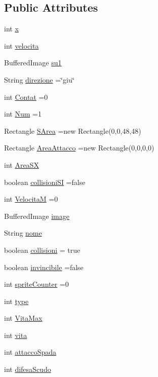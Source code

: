 \subsection*{Public Attributes}
\begin{DoxyCompactItemize}
\item 
int \hyperlink{class_entita_1_1_entita_a6150e0515f7202e2fb518f7206ed97dc}{x}
\item 
int \hyperlink{class_entita_1_1_entita_a40cd1c33d6ccf3a0571a5c5aa3c51a25}{velocita}
\item 
Buffered\+Image \hyperlink{class_entita_1_1_entita_a6e18c56eb6db900f07db511b10b4f075}{su1}
\item 
String \hyperlink{class_entita_1_1_entita_a5bda37a4dbca5f275a41dd383b905277}{direzione} =\char`\"{}giu\char`\"{}
\item 
int \hyperlink{class_entita_1_1_entita_a679c3f7220a014c0a3b78e6023747964}{Contat} =0
\item 
int \hyperlink{class_entita_1_1_entita_a558051bc0b213b418d65f58e4ad9a311}{Num} =1
\item 
Rectangle \hyperlink{class_entita_1_1_entita_abc4c4a84c9edea554a8b72a7d929e664}{S\+Area} =new Rectangle(0,0,48,48)
\item 
Rectangle \hyperlink{class_entita_1_1_entita_aee10046794f54deadcafb19e0494a719}{Area\+Attacco} =new Rectangle(0,0,0,0)
\item 
int \hyperlink{class_entita_1_1_entita_a2d5e9de91cc316910aafdea3973089d8}{Area\+SX}
\item 
boolean \hyperlink{class_entita_1_1_entita_a8253afab60c658fa3427e97e63e8d4ea}{collisioni\+SI} =false
\item 
int \hyperlink{class_entita_1_1_entita_a90a894e061963f9de7d3619983627ccc}{VelocitaM} =0
\item 
Buffered\+Image \hyperlink{class_entita_1_1_entita_a45e94f786577439d02e4f16aefa96717}{image}
\item 
String \hyperlink{class_entita_1_1_entita_a4cfff30ec02286864b995e013b6c2a41}{nome}
\item 
boolean \hyperlink{class_entita_1_1_entita_a8ba457fa7d76f9e2b54085588aced39f}{collisioni} = true
\item 
boolean \hyperlink{class_entita_1_1_entita_afb759606adf5eb47c3e8b17e32968115}{invincibile} =false
\item 
int \hyperlink{class_entita_1_1_entita_a6775e052c6cf2cbafd50a83d1e4b6fc3}{sprite\+Counter} =0
\item 
int \hyperlink{class_entita_1_1_entita_ac765329451135abec74c45e1897abf26}{type}
\item 
int \hyperlink{class_entita_1_1_entita_adf6e8908b656fe5199ca043083e48615}{Vita\+Max}
\item 
int \hyperlink{class_entita_1_1_entita_aa68a3a700682130e7af254a4b325f0cb}{vita}
\item 
int \hyperlink{class_entita_1_1_entita_a955d461d95cf97cd1806f6abc44ce485}{attacco\+Spada}
\item 
int \hyperlink{class_entita_1_1_entita_ad1c7c7fe90e4e2563cac9ed38ccb479d}{difesa\+Scudo}
\end{DoxyCompactItemize}


